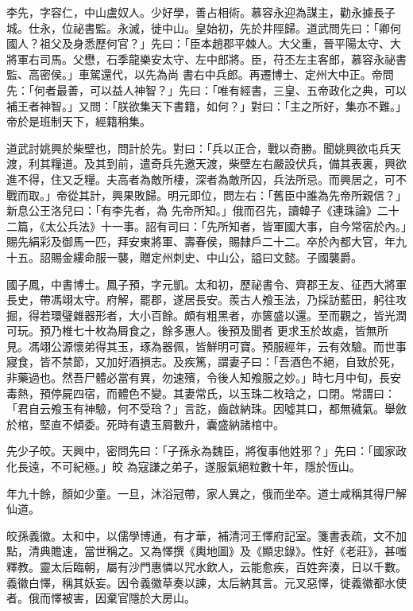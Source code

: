 \begin{pinyinscope}
 李先，字容仁，中山盧奴人。少好學，善占相術。慕容永迎為謀主，勸永據長子城。仕永，位祕書監。永滅，徙中山。皇始初，先於井陘歸。道武問先曰：「卿何國人？祖父及身悉歷何官？」先曰：「臣本趙郡平棘人。大父重，晉平陽太守、大將軍右司馬。父懋，石季龍樂安太守、左中郎將。臣，苻丕左主客郎，慕容永祕書監、高密侯。」車駕還代，以先為尚
 書右中兵郎。再遷博士、定州大中正。帝問先：「何者最善，可以益人神智？」先曰：「唯有經書，三皇、五帝政化之典，可以補王者神智。」又問：「朕欲集天下書籍，如何？」對曰：「主之所好，集亦不難。」帝於是班制天下，經籍稍集。



 道武討姚興於柴壁也，問計於先。對曰：「兵以正合，戰以奇勝。聞姚興欲屯兵天渡，利其糧道。及其到前，遣奇兵先邀天渡，柴壁左右嚴設伏兵，備其表裏，興欲進不得，住又乏糧。夫高者為敵所棲，深者為敵所囚，兵法所忌。而興居之，可不戰而取。」帝從其計，興果敗歸。明元即位，問左右：「舊臣中誰為先帝所親信？」新息公王洛兒曰：「有李先者，為
 先帝所知。」俄而召先，讀韓子《連珠論》二十二篇，《太公兵法》十一事。詔有司曰：「先所知者，皆軍國大事，自今常宿於內。」賜先絹彩及御馬一匹，拜安東將軍、壽春侯，賜隸戶二十二。卒於內都大官，年九十五。詔賜金縷命服一襲，贈定州刺史、中山公，謚曰文懿。子國襲爵。



 國子鳳，中書博士。鳳子預，字元凱。太和初，歷祕書令、齊郡王友、征西大將軍長史，帶馮翊太守。府解，罷郡，遂居長安。羨古人飧玉法，乃採訪藍田，躬往攻掘，得若環璧雜器形者，大小百餘。頗有粗黑者，亦篋盛以還。至而觀之，皆光潤可玩。預乃椎七十枚為屑食之，餘多惠人。後預及聞者
 更求玉於故處，皆無所見。馮翊公源懷弟得其玉，琢為器佩，皆鮮明可寶。預服經年，云有效驗。而世事寢食，皆不禁節，又加好酒損志。及疾篤，謂妻子曰：「吾酒色不絕，自致於死，非藥過也。然吾尸體必當有異，勿速殯，令後人知飧服之妙。」時七月中旬，長安毒熱，預停屍四宿，而體色不變。其妻常氏，以玉珠二枚琀之，口閉。常謂曰：「君自云飧玉有神驗，何不受琀？」言訖，齒啟納珠。因噓其口，都無穢氣。舉斂於棺，堅直不傾委。死時有遺玉屑數升，囊盛納諸棺中。



 先少子皎。天興中，密問先曰：「子孫永為魏臣，將復事他姓邪？」先曰：「國家政化長遠，不可紀極。」皎
 為寇謙之弟子，遂服氣絕粒數十年，隱於恆山。



 年九十餘，顏如少童。一旦，沐浴冠帶，家人異之，俄而坐卒。道士咸稱其得尸解仙道。



 皎孫義徽。太和中，以儒學博通，有才華，補清河王懌府記室。箋書表疏，文不加點，清典贍速，當世稱之。又為懌撰《輿地圖》及《顯忠錄》。性好《老莊》，甚嗤釋教。靈太后臨朝，屬有沙門惠憐以咒水飲人，云能愈疾，百姓奔湊，日以千數。義徽白懌，稱其妖妄。因令義徽草奏以諫，太后納其言。元叉惡懌，徙義徽都水使者。俄而懌被害，因棄官隱於大房山。




\end{pinyinscope}
